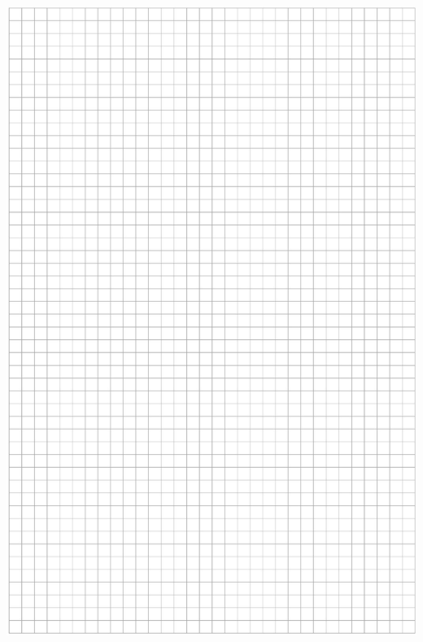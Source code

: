 \documentclass[10pt]{article}
\begin{document}
\includegraphics[max width=\textwidth, center]{2024_11_21_f1ecc00f5c4ab21f0d04g-26}\\
\end{document}
